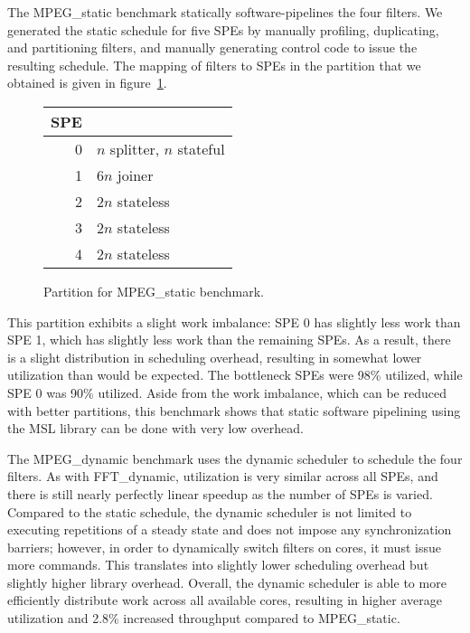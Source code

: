 The \textsf{MPEG\_static} benchmark statically software-pipelines the four filters.
We generated the static schedule for five SPEs by manually profiling, duplicating, and
partitioning filters, and manually generating control code to issue the resulting schedule.
The mapping of filters to SPEs in the partition that we obtained is given in
figure~\ref{fig:perf:mpegs}.

\begin{figure}[!htb]
\begin{center}
\begin{tabular}{|r|l|}
\hline
SPE &  \\
\hline
0 & $n$ splitter, $n$ stateful \\
\hline
1 & $6n$ joiner \\
\hline
2 & $2n$ stateless \\
\hline
3 & $2n$ stateless \\
\hline
4 & $2n$ stateless \\
\hline
\end{tabular}
\end{center}
\caption{Partition for \textsf{MPEG\_static} benchmark.}
\label{fig:perf:mpegs}
\end{figure}

This partition exhibits a slight work imbalance: SPE 0 has slightly less work than SPE 1,
which has slightly less work than the remaining SPEs.
As a result, there is a slight distribution in scheduling overhead, resulting in somewhat lower
utilization than would be expected.
The bottleneck SPEs were 98\% utilized, while SPE 0 was 90\% utilized.
Aside from the work imbalance, which can be reduced with better partitions,
this benchmark shows that static software pipelining using the MSL library can be done
with very low overhead.

The \textsf{MPEG\_dynamic} benchmark uses the dynamic scheduler to schedule the four filters.
As with \textsf{FFT\_dynamic}, utilization is very similar across all SPEs,
and there is still nearly perfectly linear speedup as the number of SPEs is varied.
Compared to the static schedule, the dynamic scheduler is not limited to executing
repetitions of a steady state and does not impose any synchronization barriers;
however, in order to dynamically switch filters on cores, it must issue more commands.
This translates into slightly lower scheduling overhead but slightly higher library overhead.
Overall, the dynamic scheduler is able to more efficiently distribute work across
all available cores, resulting in higher average utilization and 2.8\% increased throughput
compared to \textsf{MPEG\_static}.

